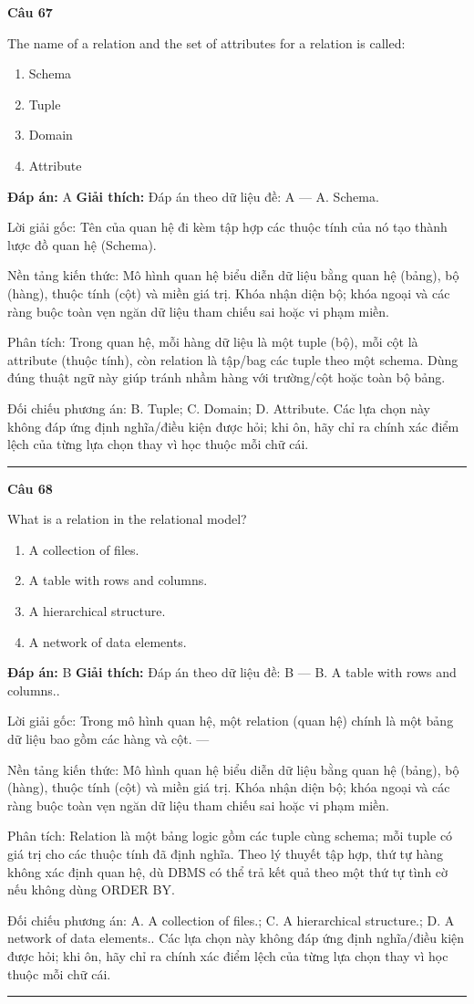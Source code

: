 \documentclass[11pt,a4paper]{article}
\newenvironment{question}[1]{%
  \par\vspace{1em}\noindent\textbf{\large Câu #1}\par\vspace{0.4em}
}{%
  \par\vspace{1em}\hrule\vspace{0.6em}
}
\newenvironment{choices}{%
  \begin{enumerate}[label=\textbf{\Alph*.},leftmargin=2.2em,itemsep=2pt,topsep=3pt]
}{%
  \end{enumerate}
}
\newcommand{\choice}{\item}
\begin{document}
\begin{question}{67}
The name of a relation and the set of attributes for a relation is called:
\begin{choices}
\choice Schema
\choice Tuple
\choice Domain
\choice Attribute
\end{choices}
\textbf{Đáp án:} A
\textbf{Giải thích:} Đáp án theo dữ liệu đề: A — A. Schema.

Lời giải gốc: Tên của quan hệ đi kèm tập hợp các thuộc tính của nó tạo thành lược đồ quan hệ (Schema).

Nền tảng kiến thức: Mô hình quan hệ biểu diễn dữ liệu bằng quan hệ (bảng), bộ (hàng), thuộc tính (cột) và miền giá trị. Khóa nhận diện bộ; khóa ngoại và các ràng buộc toàn vẹn ngăn dữ liệu tham chiếu sai hoặc vi phạm miền.

Phân tích: Trong quan hệ, mỗi hàng dữ liệu là một tuple (bộ), mỗi cột là attribute (thuộc tính), còn relation là tập/bag các tuple theo một schema. Dùng đúng thuật ngữ này giúp tránh nhầm hàng với trường/cột hoặc toàn bộ bảng.

Đối chiếu phương án: B. Tuple; C. Domain; D. Attribute. Các lựa chọn này không đáp ứng định nghĩa/điều kiện được hỏi; khi ôn, hãy chỉ ra chính xác điểm lệch của từng lựa chọn thay vì học thuộc mỗi chữ cái.
\end{question}

\begin{question}{68}
What is a relation in the relational model?
\begin{choices}
\choice A collection of files.
\choice A table with rows and columns.
\choice A hierarchical structure.
\choice A network of data elements.
\end{choices}
\textbf{Đáp án:} B
\textbf{Giải thích:} Đáp án theo dữ liệu đề: B — B. A table with rows and columns..

Lời giải gốc: Trong mô hình quan hệ, một relation (quan hệ) chính là một bảng dữ liệu bao gồm các hàng và cột. ---

Nền tảng kiến thức: Mô hình quan hệ biểu diễn dữ liệu bằng quan hệ (bảng), bộ (hàng), thuộc tính (cột) và miền giá trị. Khóa nhận diện bộ; khóa ngoại và các ràng buộc toàn vẹn ngăn dữ liệu tham chiếu sai hoặc vi phạm miền.

Phân tích: Relation là một bảng logic gồm các tuple cùng schema; mỗi tuple có giá trị cho các thuộc tính đã định nghĩa. Theo lý thuyết tập hợp, thứ tự hàng không xác định quan hệ, dù DBMS có thể trả kết quả theo một thứ tự tình cờ nếu không dùng ORDER BY.

Đối chiếu phương án: A. A collection of files.; C. A hierarchical structure.; D. A network of data elements.. Các lựa chọn này không đáp ứng định nghĩa/điều kiện được hỏi; khi ôn, hãy chỉ ra chính xác điểm lệch của từng lựa chọn thay vì học thuộc mỗi chữ cái.
\end{question}
\end{document}
